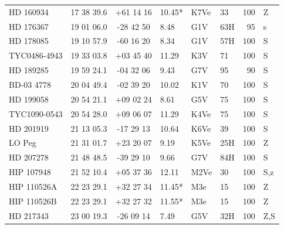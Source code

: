 \documentclass[11pt,twoside]{book}
\begin{document}
\begin{table}[]
{\begin{tabular}{l@{\hskip7pt}ccl
l@{\hskip7pt}lr@{\hskip7pt}l}
HD 160934  &17 38 39.6    &+61 14 16&       10.45*  &   K7Ve  &\hspace{2mm}33&100&Z\\
HD 176367  &19 01 06.0    &-28 42 50&       \hspace{2mm}8.48&G1V&\hspace{2mm}63H&95&s\\
HD 178085  &19 10 57.9    &-60 16 20&       \hspace{2mm}8.34  &   G1V  &\hspace{2mm}57H&  100&S\\
TYC0486-4943& 19 33 03.8  &+03 45 40&       11.29&  K3V & \hspace{2mm}71 &100&S\\
HD 189285 &  19 59 24.1   &-04 32 06&          \hspace{2mm}9.43&G7V     &\hspace{2mm}95& 90& S\\
BD-03 4778 &  20 04 49.4  &-02 39 20&       10.02&  K1V &  \hspace{2mm}70&100&S\\
HD 199058  &  20 54 21.1  &+09 02 24&   \hspace{2mm}8.61&G5V& \hspace{2mm}75&100&S\\
TYC1090-0543& 20 54 28.0  &+09 06 07&       11.29& K4Ve&\hspace{2mm}75&100&S\\
HD 201919   &21 13 05.3   &-17 29 13&      10.64  &   K6Ve  &\hspace{2mm}39& 100&S\\
LO Peg     &21 31 01.7    &+23 20 07&       \hspace{2mm}9.19  &   K5Ve &\hspace{2mm}25H&  100&Z\\
HD 207278  &21 48 48.5    &-39 29 10&       \hspace{2mm}9.66  &   G7V  &\hspace{2mm}84H&  100&S\\
HIP 107948&21 52 10.4     &+05 37 36&       12.11      &M2Ve&\hspace{2mm}30 &100&S,z\\
HIP 110526A &22 23 29.1   &+32 27 34&      11.45*  &   M3e   &\hspace{2mm}15& 100&Z\\
HIP 110526B &22 23 29.1   &+32 27 32&      11.55*  &   M3e   &\hspace{2mm}15& 100&Z\\
HD 217343  &23 00 19.3    &-26 09 14&       \hspace{2mm}7.49 & G5V&\hspace{2mm}32H&100&Z,S\\

\end{tabular}}
\end{table}
\end{document}
